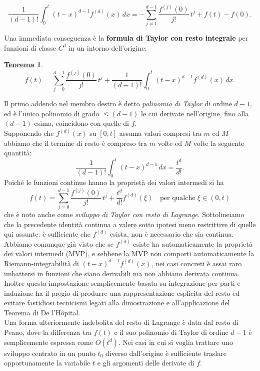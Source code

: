 \documentclass[a4paper,twoside]{article}
\theoremstyle{definition}
\newtheorem{theorem}{\color{Red}\underline{\textrm Teorema}}
\numberwithin{theorem}{section}
\begin{document}
$$ \frac{1}{(d-1)!}\int_{0}^{t}(t-x)^{d-1}f^{(d)}(x)\,dx = -\sum_{j=1}^{d-1}\frac{f^{(j)}(0)}{j!}\,t^j + f(t)-f(0). $$

Una immediata conseguenza è la \textbf{formula di Taylor con resto integrale} per funzioni di classe $C^d$ in un intorno dell'origine:
\begin{theorem}
 $$ f(t) = \sum_{j=0}^{d-1}\frac{f^{(j)}(0)}{j!}\,t^j + \frac{1}{(d-1)!}\int_{0}^{t}(t-x)^{d-1}f^{(d)}(x)\,dx. $$
\end{theorem}
Il primo addendo nel membro destro è detto \emph{polinomio di Taylor} di ordine $d-1$, ed è l'unico polinomio di grado $\leq (d-1)$ le cui derivate nell'origine, fino alla $(d-1)$-esima, coincidono con quelle di $f$.\\
Supponendo che $f^{(d)}(x)$ su $[0,t]$ assuma valori compresi tra $m$ ed $M$ abbiamo che il termine di resto è compreso tra $m$ volte ed $M$ volte la seguente quantità:
$$ \frac{1}{(d-1)!}\int_{0}^{t}(t-x)^{d-1}\,dx = \frac{t^d}{d!}. $$
Poiché le funzioni continue hanno la proprietà dei valori intermedi si ha
$$ f(t) = \sum_{j=0}^{d-1}\frac{f^{(j)}(0)}{j!}\,t^j + \frac{t^d}{d!}f^{(d)}(\xi)\quad\text{per qualche }\xi\in(0,t) $$
che è noto anche come \emph{sviluppo di Taylor con resto di Lagrange}. Sottolineiamo che la precedente identità continua a valere sotto ipotesi meno restrittive di quelle qui assunte: è sufficiente che $f^{(d)}$ esista, non è necessario che sia continua. Abbiamo comunque già visto che se $f^{(d)}$ esiste ha automaticamente la proprietà dei valori intermedi (MVP), e sebbene la MVP non comporti automaticamente la Riemann-integrabilità di $(t-x)^{d-1}f^{(d)}(x)$, nei casi concreti è assai raro imbattersi in funzioni che siano derivabili ma non abbiano derivata continua. Inoltre questa impostazione semplicemente basata su integrazione per parti e induzione ha il pregio di produrre una rappresentazione esplicita del resto ed evitare fastidiosi tecnicismi legati alla dimostrazione e all'applicazione del Teorema di De l'H\^opital.\\
Una forma ulteriormente indebolita del resto di Lagrange è data dal resto di Peano, dove la differenza tra $f(t)$ e il suo polinomio di Taylor di ordine $d-1$ è semplicemente espressa come $O(t^d)$. Nei casi in cui si voglia trattare uno sviluppo centrato in un punto $t_0$ diverso dall'origine è sufficiente traslare opportunamente la variabile $t$ e gli argomenti delle derivate di $f$.\\
\end{document}
